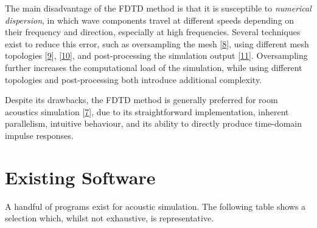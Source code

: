 \documentclass[]{scrreprt}
\begin{document}
The main disadvantage of the FDTD method is that it is susceptible to
\emph{numerical dispersion}, in which wave components travel at
different speeds depending on their frequency and direction, especially
at high frequencies. Several techniques exist to reduce this error, such
as oversampling the mesh
{[}\protect\hyperlink{ref-camposux5fcomputationalux5f2005}{8}{]}, using
different mesh topologies
{[}\protect\hyperlink{ref-saviojaux5freductionux5f1999}{9}{]},
{[}\protect\hyperlink{ref-vanux5fduyneux5ftetrahedralux5f1995}{10}{]},
and post-processing the simulation output
{[}\protect\hyperlink{ref-saviojaux5finterpolatedux5f2001}{11}{]}.
Oversampling further increases the computational load of the simulation,
while using different topologies and post-processing both introduce
additional complexity.

Despite its drawbacks, the FDTD method is generally preferred for room
acoustics simulation
{[}\protect\hyperlink{ref-valimakiux5ffiftyux5f2012}{7}{]}, due to its
straightforward implementation, inherent parallelism, intuitive
behaviour, and its ability to directly produce time-domain impulse
responses.

\section{Existing Software}\label{existing-software}

A handful of programs exist for acoustic simulation. The following table
\text{(\ref{tab:software})} shows a selection which, whilst not
exhaustive, is representative.
\end{document}
